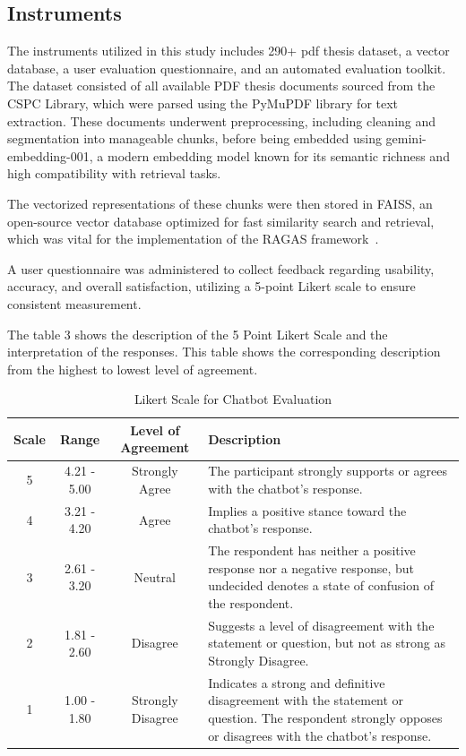 \begin{refsection}
\section{Instruments}

The instruments utilized in this study includes 290+ pdf thesis dataset, a vector database, a user evaluation questionnaire, and an automated evaluation toolkit. The dataset consisted of all available PDF thesis documents sourced from the CSPC Library, which were parsed using the PyMuPDF library for text extraction. These documents underwent preprocessing, including cleaning and segmentation into manageable chunks, before being embedded using gemini-embedding-001, a modern embedding model known for its semantic richness and high compatibility with retrieval tasks.

The vectorized representations of these chunks were then stored in FAISS, an open-source vector database optimized for fast similarity search and retrieval, which was vital for the implementation of the RAGAS framework~\cite{trychroma2023chroma}.

A user questionnaire was administered to collect feedback regarding usability, accuracy, and overall satisfaction, utilizing a 5-point Likert scale to ensure consistent measurement.

The table 3 shows the description of the 5 Point Likert Scale and the interpretation of the responses. This table shows the corresponding description from the highest to lowest level of agreement.

\begin{table}[H]
    \centering
    \caption{Likert Scale for Chatbot Evaluation}
    \begin{tabular}{|c|c|c|m{7cm}|}
        \hline
        \textbf{Scale} & \textbf{Range} & \textbf{Level of Agreement} & \textbf{Description} \\
        \hline
                5 & 4.21 - 5.00 & Strongly Agree & The participant strongly supports or agrees with the chatbot's response.\\
        \hline
                4 & 3.21 - 4.20 & Agree & Implies a positive stance toward the chatbot's response. \\
        \hline
                3 & 2.61 - 3.20 & Neutral & The respondent has neither a positive response nor a negative response, but undecided denotes a state of confusion of the respondent. \\
        \hline
                2 & 1.81 - 2.60 & Disagree & Suggests a level of disagreement with the statement or question, but not as strong as Strongly Disagree.\\
        \hline
                1 & 1.00 - 1.80 & Strongly Disagree & Indicates a strong and definitive disagreement with the statement or question. The respondent strongly opposes or disagrees with the chatbot's response.\\
        \hline
    \end{tabular}
    \label{tab:likert}
\end{table}



\end{refsection}
